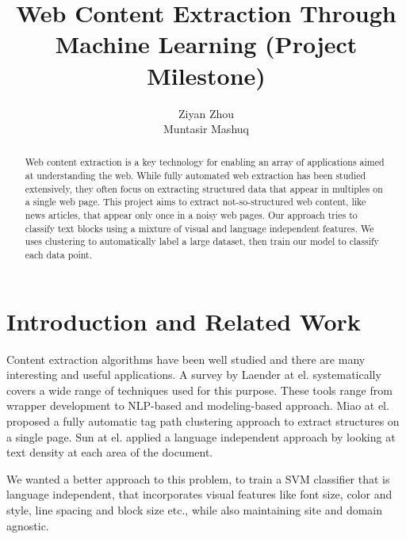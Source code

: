\documentclass{acm_proc_article-sp}
\begin{document}
\title{Web Content Extraction Through Machine Learning (Project Milestone)
}

\author{
\alignauthor
Ziyan Zhou\\
\alignauthor
Muntasir Mashuq\\
}

\maketitle

\begin{abstract}
Web content extraction is a key technology for enabling an array of applications aimed at understanding the web. While fully automated web extraction has been studied extensively, they often focus on extracting structured data that appear in multiples on a single web page. This project aims to extract not-so-structured web content, like news articles, that appear only once in a noisy web pages. Our approach tries to classify text blocks using a mixture of visual and language independent features. We uses clustering to automatically label a large dataset, then train our model to classify each data point.
\end{abstract}


\section{Introduction and Related Work}

Content extraction algorithms have been well studied and there are many interesting and useful applications\cite{diffbot}\cite{readability}. A survey by Laender at el.\cite{laender:brief} systematically covers a wide range of techniques used for this purpose. These tools range from wrapper development to NLP-based and modeling-based approach. Miao at el.\cite{gengxin:extracting} proposed a fully automatic tag path clustering approach to extract structures on a single page. Sun at el.\cite{sun2011dom} applied a language independent approach by looking at text density at each area of the document.

We wanted a better approach to this problem, to train a SVM classifier that is language independent, that incorporates visual features like font size, color and style, line spacing and block size etc., while also maintaining site and domain agnostic.
\end{document}
